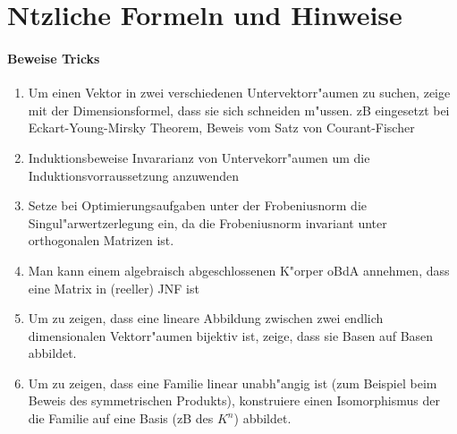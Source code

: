 \documentclass[9pt, a4paper, twocolumn, landscape]{article}
\begin{document}
 
\section{N\uee tzliche Formeln und Hinweise}
\paragraph{Beweise Tricks}
\begin{enumerate}
\item Um einen Vektor in zwei verschiedenen Untervektorr"aumen zu suchen, zeige mit der Dimensionsformel, dass sie sich schneiden m"ussen. zB eingesetzt bei Eckart-Young-Mirsky Theorem, Beweis vom Satz von Courant-Fischer
\item Induktionsbeweise Invararianz von Untervekorr"aumen um die Induktionsvorraussetzung anzuwenden
\item Setze bei Optimierungsaufgaben unter der Frobeniusnorm die Singul"arwertzerlegung ein, da die Frobeniusnorm invariant unter orthogonalen Matrizen ist.
\item Man kann einem algebraisch abgeschlossenen K"orper oBdA annehmen, dass eine Matrix in (reeller) JNF ist
\item Um zu zeigen, dass eine lineare Abbildung zwischen zwei endlich dimensionalen Vektorr"aumen bijektiv ist, zeige, dass sie Basen auf Basen abbildet.
\item Um zu zeigen, dass eine Familie linear unabh"angig ist (zum Beispiel beim Beweis des symmetrischen Produkts), konstruiere einen Isomorphismus der die Familie auf eine Basis (zB des $K^n$) abbildet.
\end{enumerate}
\end{document}
